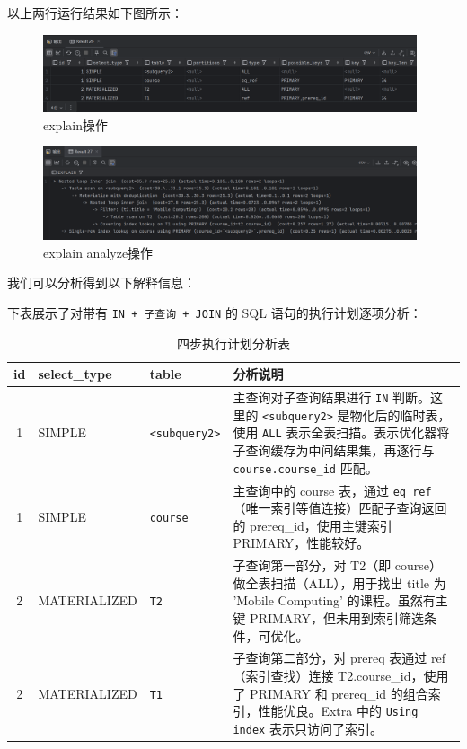 \documentclass{article}
\begin{document}
	以上两行运行结果如下图所示：
	
	\begin{figure}[H]
		\centering
		\includegraphics[width=11cm]{./images/8.解释操作1.png}
		\caption{explain操作}
	\end{figure}
	
	\begin{figure}[H]
		\centering
		\includegraphics[width=11cm]{./images/9.解释操作2.png}
		\caption{explain analyze操作}
	\end{figure}
	
	我们可以分析得到以下解释信息：
	
	下表展示了对带有 \texttt{IN + 子查询 + JOIN} 的 SQL 语句的执行计划逐项分析：
	
	\begin{table}[H]
		\centering
		\begin{tabular}{|c|l|l|p{9.5cm}|}
			\hline
			\textbf{id} & \textbf{select\_type} & \textbf{table} & \textbf{分析说明} \\
			\hline
			1 & SIMPLE & \texttt{<subquery2>} & 主查询对子查询结果进行 \texttt{IN} 判断。这里的 \texttt{<subquery2>} 是物化后的临时表，使用 \texttt{ALL} 表示全表扫描。表示优化器将子查询缓存为中间结果集，再逐行与 \texttt{course.course\_id} 匹配。 \\
			\hline
			1 & SIMPLE & \texttt{course} & 主查询中的 course 表，通过 \texttt{eq\_ref}（唯一索引等值连接）匹配子查询返回的 prereq\_id，使用主键索引 PRIMARY，性能较好。 \\
			\hline
			2 & MATERIALIZED & \texttt{T2} & 子查询第一部分，对 T2（即 course）做全表扫描（ALL），用于找出 title 为 'Mobile Computing' 的课程。虽然有主键 PRIMARY，但未用到索引筛选条件，可优化。 \\
			\hline
			2 & MATERIALIZED & \texttt{T1} & 子查询第二部分，对 prereq 表通过 ref（索引查找）连接 T2.course\_id，使用了 PRIMARY 和 prereq\_id 的组合索引，性能优良。Extra 中的 \texttt{Using index} 表示只访问了索引。 \\
			\hline
		\end{tabular}
		\caption{四步执行计划分析表}
	\end{table}
	
\end{document}
